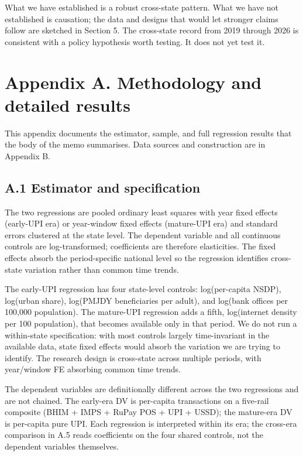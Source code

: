 \documentclass[
]{article}
\begin{document}
What we have established is a robust cross-state pattern. What we have
not established is causation; the data and designs that would let
stronger claims follow are sketched in Section 5. The cross-state record
from 2019 through 2026 is consistent with a policy hypothesis worth
testing. It does not yet test it.

\section{Appendix A. Methodology and detailed
results}\label{appendix-a.-methodology-and-detailed-results}

This appendix documents the estimator, sample, and full regression
results that the body of the memo summarises. Data sources and
construction are in Appendix B.

\subsection{A.1 Estimator and
specification}\label{a.1-estimator-and-specification}

The two regressions are pooled ordinary least squares with year fixed
effects (early-UPI era) or year-window fixed effects (mature-UPI era)
and standard errors clustered at the state level. The dependent variable
and all continuous controls are log-transformed; coefficients are
therefore elasticities. The fixed effects absorb the period-specific
national level so the regression identifies cross-state variation rather
than common time trends.

The early-UPI regression has four state-level controls: log(per-capita
NSDP), log(urban share), log(PMJDY beneficiaries per adult), and
log(bank offices per 100,000 population). The mature-UPI regression adds
a fifth, log(internet density per 100 population), that becomes
available only in that period. We do not run a within-state
specification: with most controls largely time-invariant in the
available data, state fixed effects would absorb the variation we are
trying to identify. The research design is cross-state across multiple
periods, with year/window FE absorbing common time trends.

The dependent variables are definitionally different across the two
regressions and are not chained. The early-era DV is per-capita
transactions on a five-rail composite (BHIM + IMPS + RuPay POS + UPI +
USSD); the mature-era DV is per-capita pure UPI. Each regression is
interpreted within its era; the cross-era comparison in A.5 reads
coefficients on the four shared controls, not the dependent variables
themselves.
\end{document}
